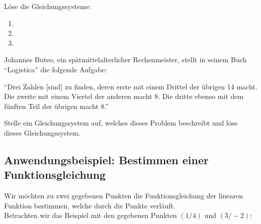 \documentclass[11pt,oneside]{article}
\begin{document}
\begin{aufgabe}
	Löse die Gleichungssysteme:
	\begin{enumerate}[label=\alph*)]
		\item {}
		\item {}
		\item {}
	\end{enumerate}
\end{aufgabe}
\begin{aufgabe}
	Johannes Buteo, ein spätmittelalterlicher Rechenmeister, stellt in seinem Buch "`Logistica"' die folgende Aufgabe: \begin{framed}"`Drei Zahlen [sind] zu finden,  deren erste mit einem Drittel der übrigen 14 macht. Die zweite mit einem Viertel der anderen macht 8. Die dritte ebenso mit dem fünften Teil der übrigen macht 8."'\end{framed}
	Stelle ein Gleichungssystem auf, welches dieses Problem beschreibt und löse dieses Gleichungssystem.
\end{aufgabe}\vspace{-0.5cm}
\subsection*{Anwendungsbeispiel: Bestimmen einer Funktionsgleichung}
Wir möchten zu zwei gegebenen Punkten die Funktionsgleichung der linearen Funktion bestimmen, welche durch die Punkte verläuft.\\
Betrachten wir das Beispiel mit den gegebenen Punkten $(1/4)$ und $(3/-2)$:\vspace{3.5cm}
\newpage
\end{document}
